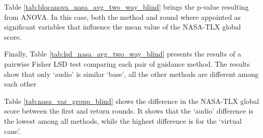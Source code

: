 Table \ref{tab:blocanova_nasa_avg_two_way_blind} brings the p-value resulting from ANOVA. In this case, both the method and round where appointed as significant variables that influence the mean value of the NASA-TLX global score. 



Finally, Table \ref{tab:lsd_nasa_avg_two_way_blind} presents the results of a pairwise Fisher LSD test comparing each pair of guidance method. The results show that only ‘audio’ is similar ‘base’, all the other methods are different among each other



Table \ref{tab:nasa_var_group_blind} shows the difference in the NASA-TLX global score between the first and return rounds. It shows that the ‘audio’ difference is the lowest among all methods, while the highest difference is for the ‘virtual cane’.



\FloatBarrier